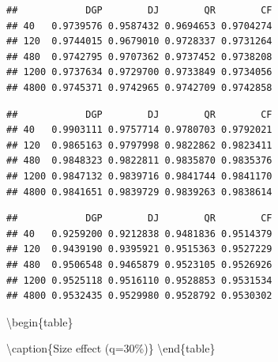 \documentclass[
]{article}
\begin{document}
\begin{verbatim}
##            DGP        DJ        QR        CF
## 40   0.9739576 0.9587432 0.9694653 0.9704274
## 120  0.9744015 0.9679010 0.9728337 0.9731264
## 480  0.9742795 0.9707362 0.9737452 0.9738208
## 1200 0.9737634 0.9729700 0.9733849 0.9734056
## 4800 0.9745371 0.9742965 0.9742709 0.9742858
\end{verbatim}

\begin{verbatim}
##            DGP        DJ        QR        CF
## 40   0.9903111 0.9757714 0.9780703 0.9792021
## 120  0.9865163 0.9797998 0.9822862 0.9823411
## 480  0.9848323 0.9822811 0.9835870 0.9835376
## 1200 0.9847132 0.9839716 0.9841744 0.9841170
## 4800 0.9841651 0.9839729 0.9839263 0.9838614
\end{verbatim}

\begin{verbatim}
##            DGP        DJ        QR        CF
## 40   0.9259200 0.9212838 0.9481836 0.9514379
## 120  0.9439190 0.9395921 0.9515363 0.9527229
## 480  0.9506548 0.9465879 0.9523105 0.9526926
## 1200 0.9525118 0.9516110 0.9528853 0.9531534
## 4800 0.9532435 0.9529980 0.9528792 0.9530302
\end{verbatim}

\textbackslash begin\{table\}

\textbackslash caption\{\label{tab:size0.3}Size effect (q=30\%)\}
\centering {} \textbackslash end\{table\}
\end{document}
